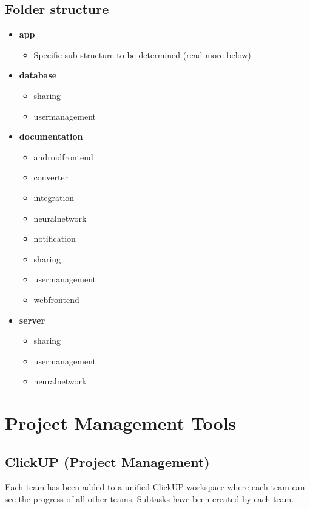 \documentclass{article}
\begin{document}
\subsection{Folder structure}
\begin{itemize}
\item \textbf{app}
    \begin{itemize}
    \item Specific sub structure to be determined (read more below)
    \end{itemize}
\item \textbf{database}
    \begin{itemize}
    \item sharing
    \item usermanagement
    \end{itemize}
\item \textbf{documentation}
    \begin{itemize}
    \item androidfrontend
    \item converter
    \item integration
    \item neuralnetwork
    \item notification
    \item sharing
    \item usermanagement
    \item webfrontend
    \end{itemize}
\item \textbf{server}
    \begin{itemize}
    \item sharing
    \item usermanagement
    \item neuralnetwork
    \end{itemize}
\end{itemize}



\section{Project Management Tools}
\subsection{ClickUP (Project Management)}
Each team has been added to a unified ClickUP workspace where each team can see the progress of all other teams. Subtasks have been created by each team.
\end{document}
